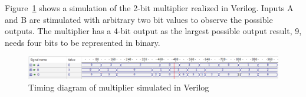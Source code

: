 Figure~\ref{fig:multiplier_sim} shows a simulation of the 2-bit multiplier realized in Verilog. Inputs A and B are stimulated with arbitrary two bit values to observe the possible outputs. The multiplier has a 4-bit output as the largest possible output result, 9, needs four bits to be represented in binary.

\begin{figure}[H]
    \centering
    \includegraphics[width=\textwidth]{Figures/Test of multiplier.png}
    \caption{Timing diagram of multiplier simulated in Verilog}
    \label{fig:multiplier_sim}
\end{figure}




